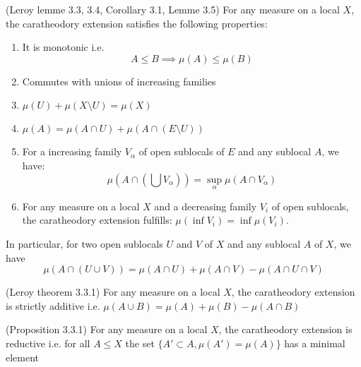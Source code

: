 \begin{proposition}
(Leroy lemme 3.3, 3.4, Corollary 3.1, Lemme 3.5)
    \label{prop:elementary_properties_of_caratheodory_extensions}
    For any measure on a local $X$, the caratheodory extension satisfies the following properties:
    \begin{enumerate}
        \item It is monotonic i.e. \[A \le B \implies \mu (A) \le \mu (B)\]
        \item Commutes with unions of increasing families
        \item $\mu(U) + \mu(X \setminus U) = \mu(X)$
        \item $\mu(A) = \mu(A \cap U) + \mu(A \cap(E\setminus U))$
        \item For a increasing family $V_{\alpha}$ of open sublocals of $E$ and any sublocal $A$, we have:
        \[\mu(A \cap(\bigcup V_{\alpha})) = \sup_\alpha \mu(A\cap V_\alpha)\]
        \item For any measure on a local $X$ and a decreasing family $V_i$ of open sublocals, the caratheodory extension fulfills: $\mu (\inf V_i) = \inf \mu(V_i)$.
    \end{enumerate}
    In particular, for two open sublocals $U$ and $V$ of $X$ and any sublocal $A$ of $X$, we have
    \[\mu(A \cap (U \cup V)) = \mu(A\cap U) + \mu(A\cap V) - \mu(A \cap U \cap V)\]
\end{proposition}



\begin{proposition}
(Leroy theorem 3.3.1)
    \label{prop:strictly_additive}
    For any measure on a local $X$, the caratheodory extension is
    strictly additive i.e. $\mu (A \cup B) = \mu(A) + \mu(B) - \mu(A \cap B)$
\end{proposition}


\begin{proposition}[reductive]
    \label{prop:reductive}  (Proposition 3.3.1)
    For any measure on a local $X$, the caratheodory extension is
    reductive i.e. for all $A \le X$ the set $\{A' \subset A, \mu(A') = \mu(A)\}$ has a minimal element
\end{proposition}


